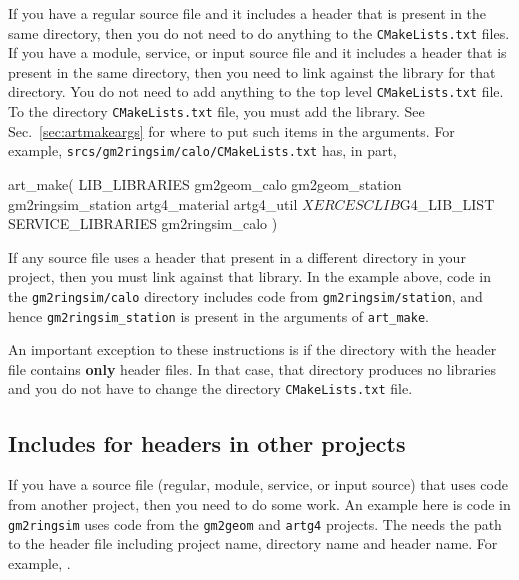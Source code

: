 If you have a regular source file and it includes a header that is
present in the same directory, then you do not need to do anything to
the \texttt{CMakeLists.txt} files. If you have a module, service, or
input source file and it includes a header that is present in the same
directory, then you need to link against the library for that
directory. You do not need to add anything to the top level
\texttt{CMakeLists.txt} file. To the directory \texttt{CMakeLists.txt}
file, you must add the library.  See Sec.~\ref{sec:artmakeargs} for
where to put such items in the arguments. For example,
\texttt{srcs/gm2ringsim/calo/CMakeLists.txt} has, in
part,


\begin{cpplisting}
  art_make( 
      LIB_LIBRARIES
          gm2geom_calo
          gm2geom_station
          gm2ringsim_station
          artg4_material
          artg4_util
          ${XERCESCLIB}
          ${G4_LIB_LIST}
      SERVICE_LIBRARIES
          gm2ringsim_calo
        )
\end{cpplisting}

If any source file uses a header that present in a different directory
in your project, then you must link against that library. In the
example above, code in the \texttt{gm2ringsim/calo} directory includes
code from \texttt{gm2ringsim/station}, and hence
\texttt{gm2ringsim\_station} is present in the arguments of
\texttt{art\_make}.

An important exception to these instructions is if the directory with
the header file contains \textbf{only} header files. In that case, that
directory produces no libraries and you do not have to change the
directory \texttt{CMakeLists.txt} file.

\subsection{Includes for headers in other projects}
\label{sec:incl-head-other}

If you have a source file (regular, module, service, or input source)
that uses code from another project, then you need to do some work. An
example here is code in \texttt{gm2ringsim} uses code from the
\texttt{gm2geom} and \texttt{artg4} projects. The  needs the path to the header file including project name,
directory name and header name. For example, . 

